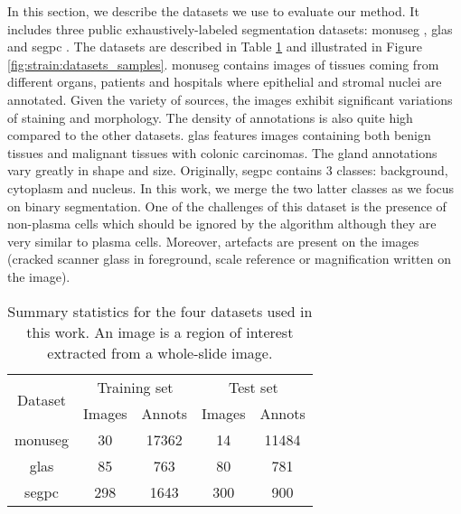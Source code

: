 In this section, we describe the datasets we use to evaluate our method. It includes three public exhaustively-labeled segmentation datasets: \acrshort{monuseg} \cite{kumar2019multi}, \acrshort{glas} \cite{sirinukunwattana2017gland} and \acrshort{segpc} \cite{gupta2021segpc}. The datasets are described in Table \ref{tab:strain:datasets_statistics} and illustrated in Figure \ref{fig:strain:datasets_samples}. \acrshort{monuseg} contains images of tissues coming from different organs, patients and hospitals where epithelial and stromal nuclei are annotated. Given the variety of sources, the images exhibit significant variations of staining and morphology. The density of annotations is also quite high compared to the other datasets. \acrshort{glas} features images containing both benign tissues and malignant tissues with colonic carcinomas. The gland annotations vary greatly in shape and size. Originally, \acrshort{segpc} contains 3 classes: background, cytoplasm and nucleus. In this work, we merge the two latter classes as we focus on binary segmentation. One of the challenges of this dataset is the presence of non-plasma cells which should be ignored by the algorithm although they are very similar to plasma cells. Moreover, artefacts are present on the images (\eg cracked scanner glass in foreground, scale reference or magnification written on the image).

\begin{table}
  \centering
  \begin{tabular}{|c|cc|cc|}
    \hline
    \multirow{2}{*}{Dataset} & \multicolumn{2}{c|}{Training set} & \multicolumn{2}{c|}{Test set}\\
    & Images & Annots    & Images & Annots  \\
    \hline
    \acrshort{monuseg} & 30 & 17362 & 14 & 11484\\
    \acrshort{glas} & 85 & 763 & 80 & 781 \\
    \acrshort{segpc} & 298 & 1643 & 300 & 900 \\
    \hline
  \end{tabular}
  \caption{Summary statistics for the four datasets used in this work. An image is a region of interest extracted from a whole-slide image.}
  \label{tab:strain:datasets_statistics}
\end{table}


